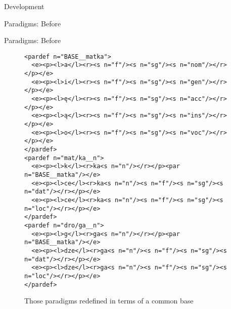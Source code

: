 \documentclass{beamer}
\begin{document}
\begin{section}{Development}
\begin{frame}{Paradigms: Before}
\end{frame}
\begin{frame}{Paradigms: Before}
\begin{figure}
\begin{small}
\begin{verbatim}
<pardef n="BASE__matka">
  <e><p><l>a</l><r><s n="f"/><s n="sg"/><s n="nom"/></r></p></e>
  <e><p><l>i</l><r><s n="f"/><s n="sg"/><s n="gen"/></r></p></e>
  <e><p><l>ę</l><r><s n="f"/><s n="sg"/><s n="acc"/></r></p></e>
  <e><p><l>ą</l><r><s n="f"/><s n="sg"/><s n="ins"/></r></p></e>
  <e><p><l>o</l><r><s n="f"/><s n="sg"/><s n="voc"/></r></p></e>
</pardef>
<pardef n="mat/ka__n">
  <e><p><l>k</l><r>ka<s n="n"/></r></p><par n="BASE__matka"/></e>
  <e><p><l>ce</l><r>ka<s n="n"/><s n="f"/><s n="sg"/><s n="dat"/></r></p></e>
  <e><p><l>ce</l><r>ka<s n="n"/><s n="f"/><s n="sg"/><s n="loc"/></r></p></e>
</pardef>
<pardef n="dro/ga__n">
  <e><p><l>g</l><r>ga<s n="n"/></r></p><par n="BASE__matka"/></e>
  <e><p><l>dze</l><r>ga<s n="n"/><s n="f"/><s n="sg"/><s n="dat"/></r></p></e>
  <e><p><l>dze</l><r>ga<s n="n"/><s n="f"/><s n="sg"/><s n="loc"/></r></p></e>
</pardef>
\end{verbatim}
\end{small}
\caption{Those paradigms redefined in terms of a common base}
\end{figure}
\end{frame}

\end{section}
\end{document}
